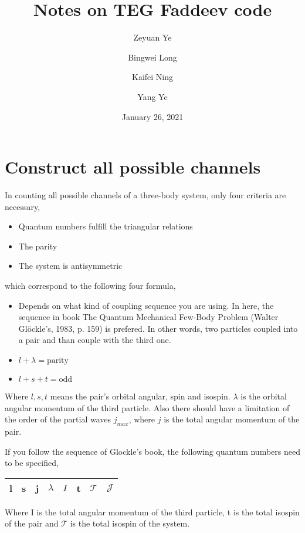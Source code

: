 \documentclass[11pt,aps]{revtex4}
\begin{document}
\date{January 26, 2021}

\title{Notes on TEG Faddeev code}

\author{Zeyuan Ye}
\author{Bingwei Long}
\author{Kaifei Ning}
\author{Yang Ye}

\maketitle

\section{Construct all possible channels}
In counting all possible channels of a three-body system, only four criteria are necessary,

\begin{itemize}
\item{Quantum numbers fulfill the triangular relations}
\item{The parity}
\item{The system is antisymmetric}
\end{itemize}

which correspond to the following four formula,

\begin{itemize}
\item{Depends on what kind of coupling sequence you are using. In here, the
    sequence in book The Quantum Mechanical Few-Body Problem (Walter Gl\"ockle's,
    1983, p. 159) is prefered. In other words, two
    particles coupled into a pair and than couple with the third one.}
\item{$l+\lambda = \text{parity}$}
\item{$l + s + t = \text{odd}$}
\end{itemize}

Where $l, s, t$ means the pair's orbital angular, spin and isospin. $\lambda$ is
the orbital angular momentum of the third particle.
Also there should have a limitation of the order of the partial waves $j_{max}$,
where $j$ is the total angular momentum of the pair.

If you follow the sequence of Glockle's book, the following quantum numbers need
to be specified,
\begin{center}
\begin{tabular}{ | c  c  c c c c c c|}
\hline
l & s & j & $\lambda$ & $I$ & t & $\mathcal{T}$ & $\mathcal{J}$ \\
\hline
\end{tabular}
\end{center}
Where I is the total angular momentum of the third particle, t is the total
isospin of the pair and $\mathcal{T}$ is the total isospin of the system.
\end{document}
